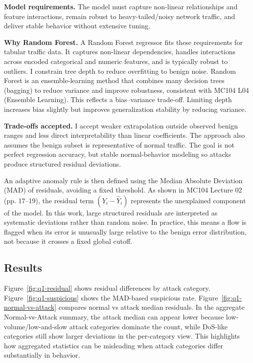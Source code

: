 \documentclass[11pt]{article}
\begin{document}
\textbf{Model requirements.} The model must capture non-linear relationships and feature interactions, remain robust to heavy-tailed/noisy network traffic, and deliver stable behavior without extensive tuning.

\textbf{Why Random Forest.} A Random Forest regressor fits these requirements for tabular traffic data. It captures non-linear dependencies, handles interactions across encoded categorical and numeric features, and is typically robust to outliers. I constrain tree depth to reduce overfitting to benign noise.
Random Forest is an ensemble-learning method that combines many decision trees (bagging) to reduce variance and improve robustness, consistent with MC104 L04 (Ensemble Learning).
This reflects a bias--variance trade-off. Limiting depth increases bias slightly but improves generalization stability by reducing variance.

\textbf{Trade-offs accepted.} I accept weaker extrapolation outside observed benign ranges and less direct interpretability than linear coefficients. The approach also assumes the benign subset is representative of normal traffic. The goal is not perfect regression accuracy, but stable normal-behavior modeling so attacks produce structured residual deviations.

An adaptive anomaly rule is then defined using the Median Absolute Deviation (MAD) of residuals, avoiding a fixed threshold.
As shown in MC104 Lecture 02 (pp. 17--19), the residual term $(Y_i-\hat{Y}_i)$ represents the unexplained component of the model. In this work, large structured residuals are interpreted as systematic deviations rather than random noise.
In practice, this means a flow is flagged when its error is unusually large relative to the benign error distribution, not because it crosses a fixed global cutoff.

\subsection{Results}
Figure~\ref{fig:q1-residual} shows residual differences by attack category. Figure~\ref{fig:q1-suspicious} shows the MAD-based suspicious rate. Figure~\ref{fig:q1-normal-vs-attack} compares normal vs attack median residuals.
In the aggregate Normal-vs-Attack summary, the attack median can appear lower because low-volume/low-and-slow attack categories dominate the count, while DoS-like categories still show larger deviations in the per-category view.
This highlights how aggregated statistics can be misleading when attack categories differ substantially in behavior.
\end{document}
